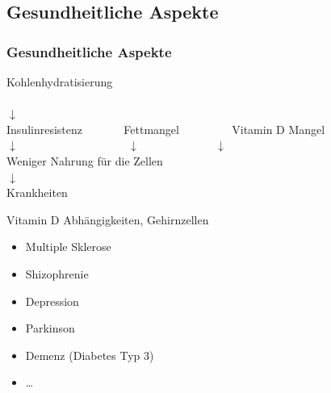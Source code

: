 \documentclass[xcolor=dvipsnames]{beamer}
\begin{document}
    \subsection{Gesundheitliche Aspekte}
    \begin{frame}[allowframebreaks]
        \frametitle{Gesundheitliche Aspekte}
        \begin{center}
            Kohlenhydratisierung ~~~~~~~~~~~~~~~~~~~~~~~~~~~~~~~~~~~~~~~~~~~~~~~~~~~~~~~~~~~~\\
            $\downarrow$ ~~~~~~~~~~~~~~~~~~~~~~~~~~~~~~~~~~~~~~\\
            Insulinresistenz ~~~~~~ Fettmangel ~~~~~~~~ Vitamin D Mangel\\
            $\downarrow$ ~~~~~~~~~~~~~~~~~~ $\downarrow$ ~~~~~~~~~~~~ $\downarrow$\\
            Weniger Nahrung für die Zellen\\
            $\downarrow$\\
            Krankheiten
        \end{center}

        \framebreak

        \begin{block}{Vitamin D Abhängigkeiten, Gehirnzellen}
            \begin{itemize}
                \setlength\itemsep{1em}
                \item Multiple Sklerose
                \item Shizophrenie
                \item Depression
                \item Parkinson
                \item Demenz (Diabetes Typ 3)
                \item \ldots
            \end{itemize}
        \end{block}

        \framebreak


\end{frame}
\end{document}
